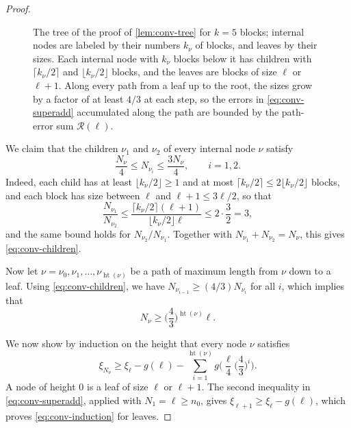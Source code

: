 \begin{proof}
\begin{figure}[t]
\centering

\caption{The tree of the proof of \cref{lem:conv-tree} for $k = 5$ blocks; internal nodes are labeled by their numbers $k_\nu$ of blocks, and leaves by their sizes. Each internal node with $k_\nu$ blocks below it has children with $\lceil k_\nu/2 \rceil$ and $\lfloor k_\nu/2 \rfloor$ blocks, and the leaves are blocks of size $\ell$ or $\ell + 1$. Along every path from a leaf up to the root, the sizes grow by a factor of at least $4/3$ at each step, so the errors in \eqref{eq:conv-superadd} accumulated along the path are bounded by the path-error sum $\mathcal R(\ell)$.}
\label{fig:conv-tree}
\end{figure}

We claim that the children $\nu_1$ and $\nu_2$ of every internal node $\nu$ satisfy
\begin{equation}\label{eq:conv-children}
\frac{N_\nu}{4} \le N_{\nu_i} \le \frac{3 N_\nu}{4}, \qquad i = 1, 2.
\end{equation}
Indeed, each child has at least $\lfloor k_\nu/2 \rfloor \ge 1$ and at most $\lceil k_\nu/2 \rceil \le 2 \lfloor k_\nu/2 \rfloor$ blocks, and each block has size between $\ell$ and $\ell + 1 \le 3\ell/2$, so that
\[
\frac{N_{\nu_1}}{N_{\nu_2}} \le \frac{\lceil k_\nu/2 \rceil (\ell + 1)}{\lfloor k_\nu/2 \rfloor \ell} \le 2 \cdot \frac 32 = 3,
\]
and the same bound holds for $N_{\nu_2}/N_{\nu_1}$. Together with $N_{\nu_1} + N_{\nu_2} = N_\nu$, this gives \eqref{eq:conv-children}.

Now let $\nu = \nu_0, \nu_1, \dots, \nu_{\operatorname{ht}(\nu)}$ be a path of maximum length from $\nu$ down to a leaf. Using \eqref{eq:conv-children}, we have $N_{\nu_{i - 1}} \ge (4/3) N_{\nu_i}$ for all $i$, which implies that
\begin{equation}\label{eq:conv-growth}
N_\nu \ge \Big(\frac 43\Big)^{\operatorname{ht}(\nu)} \ell.
\end{equation}

We now show by induction on the height that every node $\nu$ satisfies
\begin{equation}\label{eq:conv-induction}
\xi_{N_\nu} \ge \xi_\ell - g(\ell) - \sum_{i = 1}^{\operatorname{ht}(\nu)} g\Big(\frac \ell4 \Big(\frac 43\Big)^i\Big).
\end{equation}
A node of height $0$ is a leaf of size $\ell$ or $\ell + 1$. The second inequality in \eqref{eq:conv-superadd}, applied with $N_1 = \ell \ge n_0$, gives $\xi_{\ell + 1} \ge \xi_\ell - g(\ell)$, which proves \eqref{eq:conv-induction} for leaves.


\end{proof}
